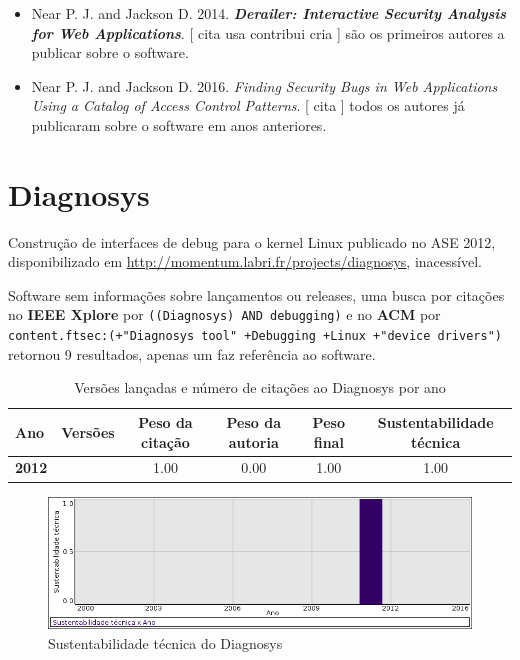 \begin{itemize}
\item Near P. J. and Jackson D.
      2014.
        \textbf{\textit{ Derailer: Interactive Security Analysis for Web Applications}}.
      [
          cita
          usa
          contribui
          cria
      ]
são os primeiros autores a publicar sobre o software.
\item Near P. J. and Jackson D.
      2016.
        \textit{ Finding Security Bugs in Web Applications Using a Catalog of Access Control Patterns}.
      [
          cita
      ]
todos os autores já publicaram sobre o software em anos anteriores.
\end{itemize}
\section{Diagnosys}

Construção de interfaces de debug para o kernel Linux
publicado no ASE 2012,
disponibilizado em \url{http://momentum.labri.fr/projects/diagnosys},
inacessível.

Software sem informações sobre lançamentos ou releases,
uma busca por citações no {\bf IEEE Xplore} por
\texttt{((Diagnosys) AND debugging)}
e no {\bf ACM} por
\texttt{content.ftsec:(+"Diagnosys tool" +Debugging +Linux +"device drivers")}
retornou
9 resultados,
apenas um faz referência ao software.


\begin{table}[H]
\caption{Versões lançadas e número de citações ao Diagnosys por ano}
\centering
\begin{tabular}{| l | c | c | c | c | c |}
  \hline
  Ano & Versões & Peso da citação & Peso da autoria & Peso final & Sustentabilidade técnica \\
  \hline
            {\bf 2012}
          &
          
          &
          1.00
          &
          0.00
          &
          1.00
          &
            {\color{blue} 1.00}
          \\
\hline
\end{tabular}
\end{table}

\begin{figure}[h]
  \center
  \includegraphics[scale=0.50]{imagens/softwares-charts/diagnosys.png}
  \caption{Sustentabilidade técnica do Diagnosys}
\end{figure}



